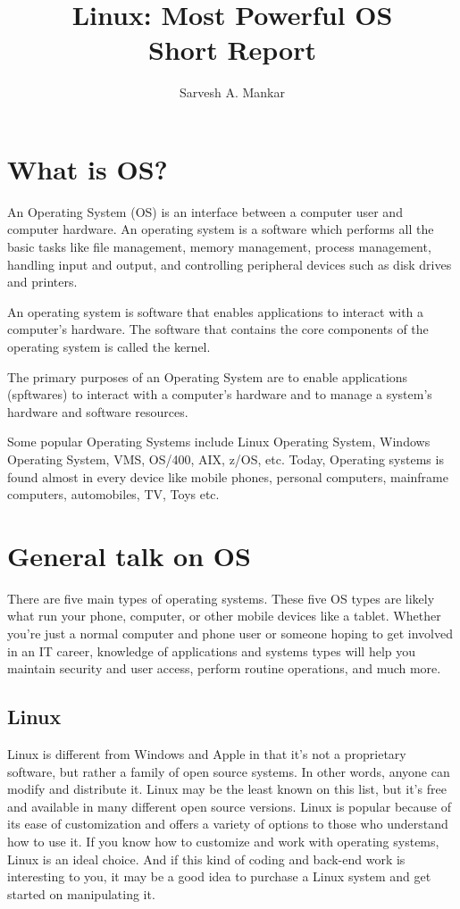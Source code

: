 \documentclass[12pt]{article}
\title{Linux: Most Powerful OS \\ Short Report}
\author{Sarvesh A. Mankar}
\begin{document}
\maketitle
\thispagestyle{empty}
\tableofcontents 


\section{What is OS?}
An Operating System (OS) is an interface between a computer user and computer hardware. An operating system is a software which performs all the basic tasks like file management, memory management, process management, handling input and output, and controlling peripheral devices such as disk drives and printers.

An operating system is software that enables applications to interact with a computer's hardware. The software that contains the core components of the operating system is called the kernel.

The primary purposes of an Operating System are to enable applications (spftwares) to interact with a computer's hardware and to manage a system's hardware and software resources.

Some popular Operating Systems include Linux Operating System, Windows Operating System, VMS, OS/400, AIX, z/OS, etc. Today, Operating systems is found almost in every device like mobile phones, personal computers, mainframe computers, automobiles, TV, Toys etc.

\section{General talk on OS}

There are five main types of operating systems. These five OS types are likely what run your phone, computer, or other mobile devices like a tablet. Whether you’re just a normal computer and phone user or someone hoping to get involved in an IT career, knowledge of applications and systems types will help you maintain security and user access, perform routine operations, and much more.

\subsection{Linux}
Linux is different from Windows and Apple in that it’s not a proprietary software, but rather a family of open source systems. In other words, anyone can modify and distribute it. Linux may be the least known on this list, but it’s free and available in many different open source versions. Linux is popular because of its ease of customization and offers a variety of options to those who understand how to use it. If you know how to customize and work with operating systems, Linux is an ideal choice. And if this kind of coding and back-end work is interesting to you, it may be a good idea to purchase a Linux system and get started on manipulating it.
\end{document}
